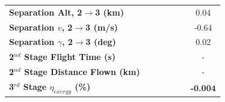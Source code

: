 \begin{table}[ht]
\begin{tabular}{l c c c c c c}
		\textbf{Separation Alt, 2$\rightarrow$3 (km)}
		& \secondthirdSeparationAltCdThreeEightyNoReturn
		& \secondthirdSeparationAltCdThreeNinetyNoReturn
		& \secondthirdSeparationAltCdThreeStandardNoReturn
		& \secondthirdSeparationAltCdThreeOneHundredTenNoReturn
		& \secondthirdSeparationAltCdThreeOneHundredTwentyNoReturn
		&0.04
		\\
		\textbf{Separation $v$, 2$\rightarrow$3 (m/s)}
		& \secondthirdSeparationvCdThreeEightyNoReturn
		& \secondthirdSeparationvCdThreeNinetyNoReturn
		& \secondthirdSeparationvCdThreeStandardNoReturn
		& \secondthirdSeparationvCdThreeOneHundredTenNoReturn
		& \secondthirdSeparationvCdThreeOneHundredTwentyNoReturn
		&-0.64
		\\
		\textbf{Separation $\gamma$, 2$\rightarrow$3 (deg)}
		& \secondthirdSeparationgammaCdThreeEightyNoReturn
		& \secondthirdSeparationgammaCdThreeNinetyNoReturn
		& \secondthirdSeparationgammaCdThreeStandardNoReturn
		& \secondthirdSeparationgammaCdThreeOneHundredTenNoReturn
		& \secondthirdSeparationgammaCdThreeOneHundredTwentyNoReturn
		&0.02
		\\
		\textbf{2$^{nd}$ Stage Flight Time (s)}
		& \secondFlightTimeCdThreeEightyNoReturn
		& \secondFlightTimeCdThreeNinetyNoReturn
		& \secondFlightTimeCdThreeStandardNoReturn
		& \secondFlightTimeCdThreeOneHundredTenNoReturn
		& \secondFlightTimeCdThreeOneHundredTwentyNoReturn
		& -
		\\
		\textbf{2$^{nd}$ Stage Distance Flown (km)}
		& \SecondDistCdThreeEightyNoReturn
		& \SecondDistCdThreeNinetyNoReturn
		& \SecondDistCdThreeStandardNoReturn
		& \SecondDistCdThreeOneHundredTenNoReturn
		& \SecondDistCdThreeOneHundredTwentyNoReturn
		& -
		\\
		\hline 
		\textbf{3$^{rd}$ Stage $\eta_{exergy}$ (\%)}
		& \textbf{\thirddExergyEffCdThreeEightyNoReturn}
		& \textbf{\thirddExergyEffCdThreeNinetyNoReturn}
		& \textbf{\thirddExergyEffCdThreeStandardNoReturn}
		& \textbf{\thirddExergyEffCdThreeOneHundredTenNoReturn}
		& \textbf{\thirddExergyEffCdThreeOneHundredTwentyNoReturn}
		& \textbf{-0.004}
		\\
	

\end{tabular}
\end{table}
